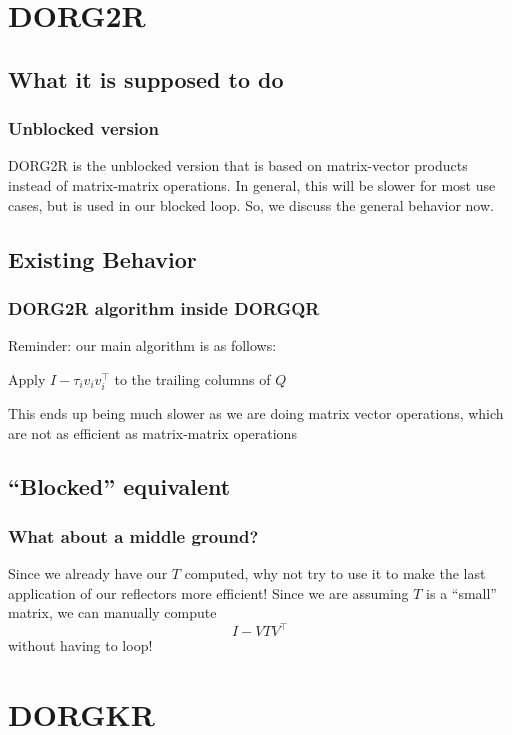 \documentclass[12pt]{beamer}
\begin{document}
    \section{DORG2R}
    \subsection{What it is supposed to do}
    \begin{frame}
        \frametitle{Unblocked version}
        DORG2R is the unblocked version that is based on matrix-vector products instead of matrix-matrix 
        operations. In general, this will be slower for most use cases, but is used in our blocked loop. So, we discuss the general behavior now.
    \end{frame}
    \subsection{Existing Behavior}
    \begin{frame}
        \frametitle{DORG2R algorithm inside DORGQR}
        Reminder: our main algorithm is as follows:
        \begin{algorithmic}[1]
            \State Apply $I-\tau_iv_iv_i^\top$ to the trailing columns of $Q$
            \EndFor
        \end{algorithmic}
        This ends up being much slower as we are doing matrix vector operations, which are not as
        efficient as matrix-matrix operations
    \end{frame}
    \subsection{``Blocked'' equivalent}
    \begin{frame}
        \frametitle{What about a middle ground?}
        Since we already have our $T$ computed, why not try to use it to make the last application of our reflectors
        more efficient! Since we are assuming $T$ is a ``small'' matrix, we can manually compute 
        $$
            I - VTV^\top
        $$
        without having to loop!
    \end{frame}
    \section{DORGKR}
\end{document}
